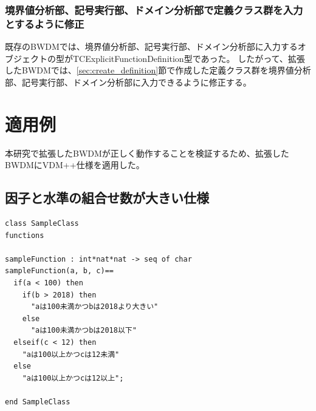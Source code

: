 \documentclass[uplatex, report, a4j, 10pt]{jsbook}
\begin{document}

\subsection{境界値分析部、記号実行部、ドメイン分析部で定義クラス群を入力とするように修正}
既存のBWDMでは、境界値分析部、記号実行部、ドメイン分析部に入力するオブジェクトの型がTCExplicitFunctionDefinition型であった。
したがって、拡張したBWDMでは、\ref{sec:create_definition}節で作成した定義クラス群を境界値分析部、記号実行部、ドメイン分析部に入力できるように修正する。

\chapter{適用例}\label{cha:Indication}
本研究で拡張したBWDMが正しく動作することを検証するため、拡張したBWDMにVDM++仕様を適用した。


\section{因子と水準の組合せ数が大きい仕様}

\lstset{language=}
\noindent\begin{minipage}{\textwidth}
  \begin{lstlisting}[caption=因子が3、水準が(6 6 6)の関数を持つVDM++仕様,label=fig:pict4javaSampleVdm]
class SampleClass
functions

sampleFunction : int*nat*nat -> seq of char
sampleFunction(a, b, c)==
  if(a < 100) then
    if(b > 2018) then
      "aは100未満かつbは2018より大きい"
    else
      "aは100未満かつbは2018以下"
  elseif(c < 12) then
    "aは100以上かつcは12未満"
  else
    "aは100以上かつcは12以上";

end SampleClass
\end{lstlisting}
\end{minipage}
\end{document}

